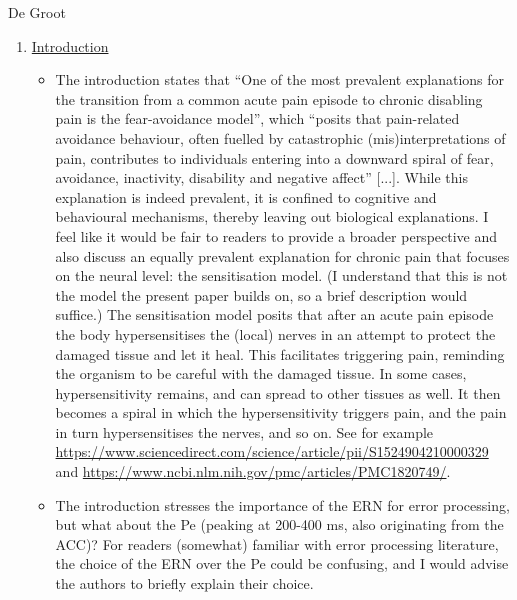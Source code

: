 \documentclass[twocolumn, serif, authordate, review]{jote-article}
\begin{document}
\begin{paracol}{2}
\begin{reviewend}{De Groot}
\begin{enumerate}[label=\textbf{\arabic*}), start=0]
    \item \hyperref[sec:introduction]{Introduction}
        \begin{itemize}
            \item The introduction states that ``One of the most prevalent explanations for the transition from a common acute pain episode to chronic disabling pain is the fear-avoidance model'', which ``posits that pain-related avoidance behaviour, often fuelled by catastrophic (mis)interpretations of pain, contributes to individuals entering into a downward spiral of fear, avoidance, inactivity, disability and negative affect'' [...]. While this explanation is indeed prevalent, it is confined to cognitive and behavioural mechanisms, thereby leaving out biological explanations. I feel like it would be fair to readers to provide a broader perspective and also discuss an equally prevalent explanation for chronic pain that focuses on the neural level: the sensitisation model. (I understand that this is not the model the present paper builds on, so a brief description would suffice.) The sensitisation model posits that after an acute pain episode the body hypersensitises the (local) nerves in an attempt to protect the damaged tissue and let it heal. This facilitates triggering pain, reminding the organism to be careful with the damaged tissue. In some cases, hypersensitivity remains, and can spread to other tissues as well. It then becomes a spiral in which the hypersensitivity triggers pain, and the pain in turn hypersensitises the nerves, and so on. See for example \href{https://www.sciencedirect.com/science/article/pii/S1524904210000329}{https://www.sciencedirect.com/science/article/pii/S1524904210000329} and \href{https://www.ncbi.nlm.nih.gov/pmc/articles/PMC1820749/}{https://www.ncbi.nlm.nih.gov/pmc/articles/PMC1820749/}.
            \item The introduction stresses the importance of the ERN for error processing, but what about the Pe (peaking at 200-400 ms, also originating from the ACC)? For readers (somewhat) familiar with error processing literature, the choice of the ERN over the Pe could be confusing, and I would advise the authors to briefly explain their choice.
        \end{itemize}


\end{enumerate}
\end{reviewend}
\end{paracol}
\end{document}
